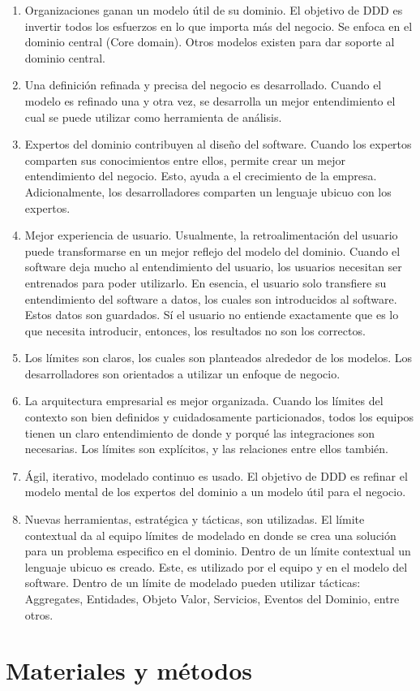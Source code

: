 \documentclass[12pt,twoside]{reedthesis}
\begin{document}
\begin{enumerate}
\def\labelenumi{\arabic{enumi}.}
\item
  Organizaciones ganan un modelo útil de su dominio. El objetivo de DDD es invertir todos los esfuerzos en lo que importa más del negocio. Se enfoca en el dominio central (Core domain). Otros modelos existen para dar soporte al dominio central.
\item
  Una definición refinada y precisa del negocio es desarrollado. Cuando el modelo es refinado una y otra vez, se desarrolla un mejor entendimiento el cual se puede utilizar como herramienta de análisis.
\item
  Expertos del dominio contribuyen al diseño del software. Cuando los expertos comparten sus conocimientos entre ellos, permite crear un mejor entendimiento del negocio. Esto, ayuda a el crecimiento de la empresa. Adicionalmente, los desarrolladores comparten un lenguaje ubicuo con los expertos.
\item
  Mejor experiencia de usuario. Usualmente, la retroalimentación del usuario puede transformarse en un mejor reflejo del modelo del dominio. Cuando el software deja mucho al entendimiento del usuario, los usuarios necesitan ser entrenados para poder utilizarlo. En esencia, el usuario solo transfiere su entendimiento del software a datos, los cuales son introducidos al software. Estos datos son guardados. Sí el usuario no entiende exactamente que es lo que necesita introducir, entonces, los resultados no son los correctos.
\item
  Los límites son claros, los cuales son planteados alrededor de los modelos. Los desarrolladores son orientados a utilizar un enfoque de negocio.
\item
  La arquitectura empresarial es mejor organizada. Cuando los límites del contexto son bien definidos y cuidadosamente particionados, todos los equipos tienen un claro entendimiento de donde y porqué las integraciones son necesarias. Los límites son explícitos, y las relaciones entre ellos también.
\item
  Ágil, iterativo, modelado continuo es usado. El objetivo de DDD es refinar el modelo mental de los expertos del dominio a un modelo útil para el negocio.
\item
  Nuevas herramientas, estratégica y tácticas, son utilizadas. El límite contextual da al equipo límites de modelado en donde se crea una solución para un problema especifico en el dominio. Dentro de un límite contextual un lenguaje ubicuo es creado. Este, es utilizado por el equipo y en el modelo del software. Dentro de un límite de modelado pueden utilizar tácticas: Aggregates, Entidades, Objeto Valor, Servicios, Eventos del Dominio, entre otros.
\end{enumerate}
\hypertarget{materiales-y-metodos}{%
\chapter{Materiales y métodos}\label{materiales-y-metodos}}
\end{document}
